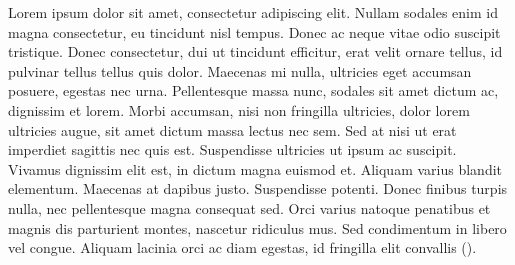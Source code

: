 \documentclass[draft=false
              ,paper=a4
              ,twoside=false
              ,fontsize=10pt
              ,headsepline
              ,BCOR10mm
              ,DIV11
              ]{article}
\begin{document}
Lorem ipsum dolor sit amet, consectetur adipiscing elit. Nullam sodales enim id magna consectetur, eu tincidunt nisl tempus. Donec ac neque vitae odio suscipit tristique. Donec consectetur, dui ut tincidunt efficitur, erat velit ornare tellus, id pulvinar tellus tellus quis dolor. Maecenas mi nulla, ultricies eget accumsan posuere, egestas nec urna. Pellentesque massa nunc, sodales sit amet dictum ac, dignissim et lorem. Morbi accumsan, nisi non fringilla ultricies, dolor lorem ultricies augue, sit amet dictum massa lectus nec sem. Sed at nisi ut erat imperdiet sagittis nec quis est. Suspendisse ultricies ut ipsum ac suscipit. Vivamus dignissim elit est, in dictum magna euismod et. Aliquam varius blandit elementum. Maecenas at dapibus justo. Suspendisse potenti. Donec finibus turpis nulla, nec pellentesque magna consequat sed. Orci varius natoque penatibus et magnis dis parturient montes, nascetur ridiculus mus. Sed condimentum in libero vel congue. Aliquam lacinia orci ac diam egestas, id fringilla elit convallis (\cite[p.~904]{ruggie_concept_2017}).

\printbibliography[title={List of references}]

\newpage

\end{document}

